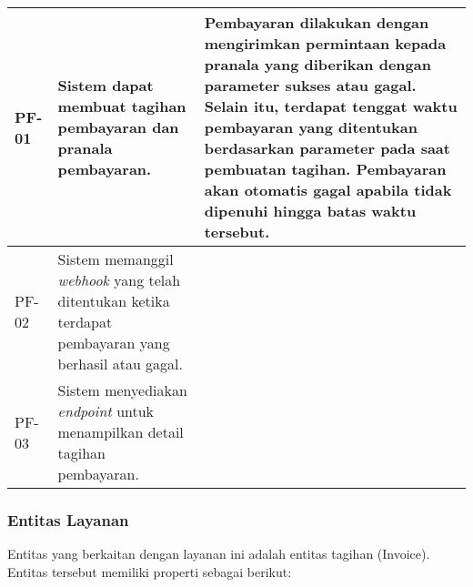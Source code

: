 \begin{longtable}{|l|p{}|p{}|}
    \hline
    PF-01       & Sistem dapat membuat tagihan pembayaran dan pranala pembayaran.                                                                                                                                                                 & Pembayaran dilakukan dengan mengirimkan permintaan kepada pranala yang diberikan dengan parameter sukses atau gagal. Selain itu, terdapat tenggat waktu pembayaran yang ditentukan berdasarkan parameter pada saat pembuatan tagihan. Pembayaran akan otomatis gagal apabila tidak dipenuhi hingga batas waktu tersebut. \\
    \hline
    PF-02       & Sistem memanggil \textit{webhook} yang telah ditentukan ketika terdapat pembayaran yang berhasil atau gagal.                                                                                                                    &                                                                                                                                                                     \\
    \hline
    PF-03       & Sistem menyediakan \textit{endpoint} untuk menampilkan detail tagihan pembayaran.                                                                                                                                               &                                                                                                                                                                                                                                                                                                                                                       \\
\end{longtable}
\endgroup

\subsubsection{Entitas Layanan}

Entitas yang berkaitan dengan layanan ini adalah entitas tagihan (Invoice). Entitas tersebut memiliki properti sebagai berikut:

